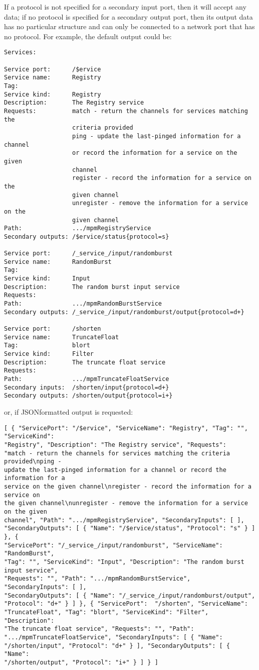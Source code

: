 If a protocol is not specified for a secondary input port, then it will accept any data;
if no protocol is specified for a secondary output port, then its output data has no
particular structure and can only be connected to a \yarp{} network port that has no
protocol.
\condPage{}
For example, the default output could be:
\outputBegin
\begin{verbatim}
Services:

Service port:      /$ervice
Service name:      Registry
Tag:
Service kind:      Registry
Description:       The Registry service
Requests:          match - return the channels for services matching the
                   criteria provided
                   ping - update the last-pinged information for a channel
                   or record the information for a service on the given
                   channel
                   register - record the information for a service on the
                   given channel
                   unregister - remove the information for a service on the
                   given channel
Path:              .../mpmRegistryService
Secondary outputs: /$ervice/status{protocol=s}

Service port:      /_service_/input/randomburst
Service name:      RandomBurst
Tag:
Service kind:      Input
Description:       The random burst input service
Requests:
Path:              .../mpmRandomBurstService
Secondary outputs: /_service_/input/randomburst/output{protocol=d+}

Service port:      /shorten
Service name:      TruncateFloat
Tag:               blort
Service kind:      Filter
Description:       The truncate float service
Requests:
Path:              .../mpmTruncateFloatService
Secondary inputs:  /shorten/input{protocol=d+}
Secondary outputs: /shorten/output{protocol=i+}
\end{verbatim}
\outputEnd
\condPage{}
or, if JSON\longDash{}formatted output is requested:
\outputBegin
\begin{verbatim}
[ { "ServicePort": "/$ervice", "ServiceName": "Registry", "Tag": "", "ServiceKind":
"Registry", "Description": "The Registry service", "Requests":
"match - return the channels for services matching the criteria provided\nping -
update the last-pinged information for a channel or record the information for a
service on the given channel\nregister - record the information for a service on
the given channel\nunregister - remove the information for a service on the given
channel", "Path": ".../mpmRegistryService", "SecondaryInputs": [ ],
"SecondaryOutputs": [ { "Name": "/$ervice/status", "Protocol": "s" } ] }, {
"ServicePort": "/_service_/input/randomburst", "ServiceName": "RandomBurst",
"Tag": "", "ServiceKind": "Input", "Description": "The random burst input service",
"Requests": "", "Path": ".../mpmRandomBurstService", "SecondaryInputs": [ ],
"SecondaryOutputs": [ { "Name": "/_service_/input/randomburst/output",
"Protocol": "d+" } ] }, { "ServicePort":  "/shorten", "ServiceName":
"TruncateFloat", "Tag": "blort", "ServiceKind": "Filter", "Description":
"The truncate float service", "Requests": "", "Path":
".../mpmTruncateFloatService", "SecondaryInputs": [ { "Name":
"/shorten/input", "Protocol": "d+" } ], "SecondaryOutputs": [ { "Name":
"/shorten/output", "Protocol": "i+" } ] } ]
\end{verbatim}
